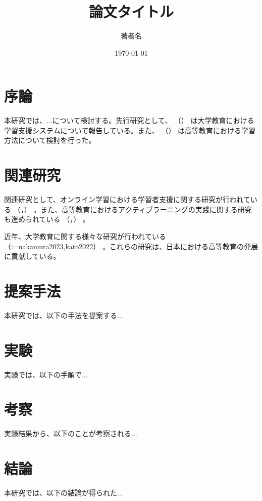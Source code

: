 \documentclass[a4paper,11pt,uplatex]{jsarticle}
\makeatletter
\newcommand{\jcite}[1]{%
  \citeauthor{#1}（\citeyear{#1}）%
}
\newcommand{\jpcite}[1]{%
  （\citeauthor{#1}，\citeyear{#1}）%
}
\newcommand{\jpcites}[1]{%
  （\def\i{1}\@for\@citeb:=#1\do{%
    \ifnum\i=1\else；\fi%
    \edef\i{0}%
    \citeauthor{\@citeb}，\citeyear{\@citeb}%
  }）%
}
\makeatother
\begin{document}
\title{論文タイトル}
\author{著者名}
\date{\today}
\maketitle

\tableofcontents

\section{序論}
本研究では、...について検討する。先行研究として、\jcite{yamada2020}は大学教育における学習支援システムについて報告している。また、\jcite{tanaka2021}は高等教育における学習方法について検討を行った。

\section{関連研究}
関連研究として、オンライン学習における学習者支援に関する研究が行われている\jpcite{suzuki2022}。また、高等教育におけるアクティブラーニングの実践に関する研究も進められている\jpcite{sato2021}。

近年、大学教育に関する様々な研究が行われている\jpcites{nakamura2023,kato2022}。これらの研究は、日本における高等教育の発展に貢献している。

\section{提案手法}
本研究では、以下の手法を提案する...

\section{実験}
実験では、以下の手順で...

\section{考察}
実験結果から、以下のことが考察される...

\section{結論}
本研究では、以下の結論が得られた...

\printbibheading[title=参考文献]

\newrefcontext[labelprefix=J]
\printbibliography[heading=none,check=japanese]

\newrefcontext[labelprefix=F]
\printbibliography[heading=none,check=notjapanese,resetnumbers=false]
\end{document}
